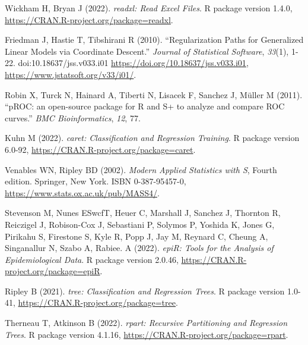 \documentclass[preprint, 3p,
authoryear]{elsarticle} %
\begin{document}
Wickham H, Bryan J (2022). \emph{readxl: Read Excel Files}. R package
version 1.4.0, \url{https://CRAN.R-project.org/package=readxl}.

Friedman J, Hastie T, Tibshirani R (2010). ``Regularization Paths for
Generalized Linear Models via Coordinate Descent.'' \emph{Journal of
Statistical Software}, \emph{33}(1), 1-22. doi:10.18637/jss.v033.i01
\url{https://doi.org/10.18637/jss.v033.i01},
\url{https://www.jstatsoft.org/v33/i01/}.

Robin X, Turck N, Hainard A, Tiberti N, Lisacek F, Sanchez J, Müller M
(2011). ``pROC: an open-source package for R and S+ to analyze and
compare ROC curves.'' \emph{BMC Bioinformatics}, \emph{12}, 77.

Kuhn M (2022). \emph{caret: Classification and Regression Training}. R
package version 6.0-92, \url{https://CRAN.R-project.org/package=caret}.

Venables WN, Ripley BD (2002). \emph{Modern Applied Statistics with S},
Fourth edition. Springer, New York. ISBN 0-387-95457-0,
\url{https://www.stats.ox.ac.uk/pub/MASS4/}.

Stevenson M, Nunes ESwcfT, Heuer C, Marshall J, Sanchez J, Thornton R,
Reiczigel J, Robison-Cox J, Sebastiani P, Solymos P, Yoshida K, Jones G,
Pirikahu S, Firestone S, Kyle R, Popp J, Jay M, Reynard C, Cheung A,
Singanallur N, Szabo A, Rabiee. A (2022). \emph{epiR: Tools for the
Analysis of Epidemiological Data}. R package version 2.0.46,
\url{https://CRAN.R-project.org/package=epiR}.

Ripley B (2021). \emph{tree: Classification and Regression Trees}. R
package version 1.0-41, \url{https://CRAN.R-project.org/package=tree}.

Therneau T, Atkinson B (2022). \emph{rpart: Recursive Partitioning and
Regression Trees}. R package version 4.1.16,
\url{https://CRAN.R-project.org/package=rpart}.


\end{document}
